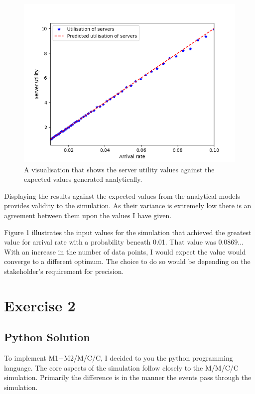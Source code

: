 \documentclass{ecmm427_assignment}
\begin{document}
\begin{figure}[H]
 \centering
\includegraphics[scale=0.65]{MMCCUtilisation.png}
\caption{A visualisation that shows the server utility values against the expected values generated analytically.}
\end{figure}

Displaying the results against the expected values from the analytical models provides validity to the simulation. As their variance is extremely low there is an agreement between them upon the values I have given.

Figure 1 illustrates the input values for the simulation that achieved the greatest value for arrival rate with a probability beneath 0.01. That value was 0.0869... With an increase in the number of data points, I would expect the value would converge to a different optimum. The choice to do so would be depending on the stakeholder's requirement for precision.
 
\section{Exercise 2}

\subsection{Python Solution}

To implement M1+M2/M/C/C, I decided to you the python programming language. The core aspects of the simulation follow closely to the M/M/C/C simulation. Primarily the difference is in the manner the events pass through the simulation.
\end{document}
